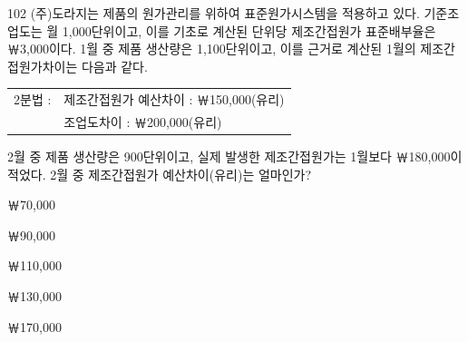 \begin{question}{102}
(주)도라지는 제품의 원가관리를 위하여 표준원가시스템을 적용하고 있다. 기준조업도는 월 1,000단위이고, 이를 기초로 계산된 단위당 제조간접원가 표준배부율은 ￦3,000이다. 1월 중 제품 생산량은 1,100단위이고, 이를 근거로 계산된 1월의 제조간접원가차이는 다음과 같다.

{\small\centering
\begin{tabular}{|ll|}
\hline
2분법 : & 제조간접원가 예산차이 : ￦150,000(유리) \\
 & 조업도차이 : ￦200,000(유리) \\
\hline
\end{tabular}\par}

2월 중 제품 생산량은 900단위이고, 실제 발생한 제조간접원가는 1월보다 ￦180,000이 적었다. 2월 중 제조간접원가 예산차이(유리)는 얼마인가?
\begin{choices}
  \item ￦70,000
  \item ￦90,000
  \item ￦110,000
  \item ￦130,000
  \item ￦170,000
\end{choices}
\end{question}
